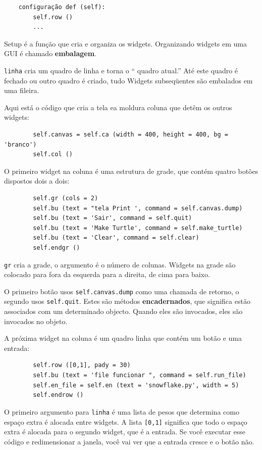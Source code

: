 \documentclass[10pt]{book}
\begin{document}
\begin{v erbatim}
\begin{verbatim}
    configuração def (self):
        self.row ()
        ...
\end{verbatim}
%
{Setup \tt} é a função que cria e organiza os widgets.
Organizando widgets em uma GUI é chamado {\bf embalagem}.

{\tt linha} cria um quadro de linha e torna o `` quadro atual.''
Até este quadro é fechado ou outro quadro é criado, tudo
Widgets subseqüentes são embalados em uma fileira.

Aqui está o código que cria a tela ea moldura coluna
que detêm os outros widgets:

\begin{verbatim}
        self.canvas = self.ca (width = 400, height = 400, bg = 'branco')
        self.col ()
\end{verbatim}
%
O primeiro widget na coluna é uma estrutura de grade, que contém
quatro botões dispostos dois a dois:

\begin{verbatim}
        self.gr (cols = 2)
        self.bu (text = "tela Print ', command = self.canvas.dump)
        self.bu (text = 'Sair', command = self.quit)
        self.bu (text = 'Make Turtle', command = self.make_turtle)
        self.bu (text = 'Clear', command = self.clear)
        self.endgr ()
\end{verbatim}
%
{\tt gr} cria a grade, o argumento é o número de
colunas. Widgets na grade são
colocado para fora da esquerda para a direita, de cima para baixo.

O primeiro botão usos {\tt self.canvas.dump} como uma chamada de retorno, o segundo
usos {\tt self.quit}. Estes são métodos {\bf encadernados}, que significa
estão associados com um determinado objecto. Quando eles são invocados, eles
são invocados no objeto.

A próxima widget na coluna é um quadro linha que contém
um botão e uma entrada:

\begin{verbatim}
        self.row ([0,1], pady = 30)
        self.bu (text = 'file funcionar ", command = self.run_file)
        self.en_file = self.en (text = 'snowflake.py', width = 5)
        self.endrow ()
\end{verbatim}
%
O primeiro argumento para {\tt linha} é uma lista de pesos que
determina como espaço extra é alocada entre widgets.  
A lista {\tt [0,1]} significa que todo o espaço extra é alocada
para o segundo widget, que é a entrada. Se você executar esse código
e redimensionar a janela, você vai ver que a entrada cresce e
o botão não.


\end{v erbatim}
\end{document}
